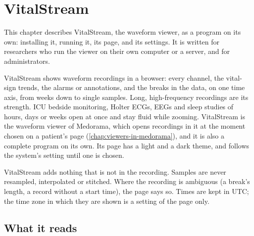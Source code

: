 \chapter{VitalStream}
\label{chap:vitalstream}

This chapter describes VitalStream, the waveform viewer, as a program on its own: installing
it, running it, its page, and its settings. It is written for researchers who run the viewer on
their own computer or a server, and for administrators.

VitalStream shows waveform recordings in a browser: every channel, the vital-sign trends, the
alarms or annotations, and the breaks in the data, on one time axis, from weeks down to single
samples. Long, high-frequency recordings are its strength. ICU bedside monitoring, Holter ECGs,
EEGs and sleep studies of hours, days or weeks open at once and stay fluid while zooming.
VitalStream is the waveform viewer of Medorama, which opens recordings in it at the moment chosen
on a patient's page (\cref{chap:viewers-in-medorama}), and it is also a complete program on its
own. Its page has a light and a dark theme, and follows the system's setting until one is
chosen.

VitalStream adds nothing that is not in the recording. Samples are never resampled, interpolated
or stitched. Where the recording is ambiguous (a break's length, a record without a start time),
the page says so. Times are kept in UTC; the time zone in which they are shown is a setting of
the page only.


\section{What it reads}
\label{sec:vitalstream-reads}

